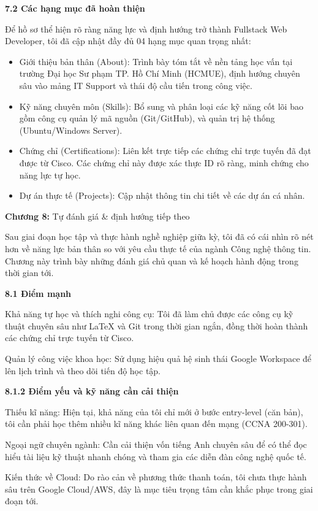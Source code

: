 \documentclass[
]{article}
\begin{document}
\textbf{7.2 Các hạng mục đã hoàn thiện}

Để hồ sơ thể hiện rõ ràng năng lực và định hướng trở thành Fullstack Web
Developer, tôi đã cập nhật đầy đủ 04 hạng mục quan trọng nhất:

\begin{itemize}
\item
  Giới thiệu bản thân (About): Trình bày tóm tắt về nền tảng học vấn tại
  trường Đại học Sư phạm TP. Hồ Chí Minh (HCMUE), định hướng chuyên sâu
  vào mảng IT Support và thái độ cầu tiến trong công việc.
\item
  Kỹ năng chuyên môn (Skills): Bổ sung và phân loại các kỹ năng cốt lõi
  bao gồm công cụ quản lý mã nguồn (Git/GitHub), và quản trị hệ thống
  (Ubuntu/Windows Server).
\item
  Chứng chỉ (Certifications): Liên kết trực tiếp các chứng chỉ trực
  tuyến đã đạt được từ Cisco. Các chứng chỉ này được xác thực ID rõ
  ràng, minh chứng cho năng lực tự học.
\item
  Dự án thực tế (Projects): Cập nhật thông tin chi tiết về các dự án cá
  nhân.
\end{itemize}

\textbf{Chương 8:} Tự đánh giá \& định hướng tiếp theo

Sau giai đoạn học tập và thực hành nghề nghiệp giữa kỳ, tôi đã có cái
nhìn rõ nét hơn về năng lực bản thân so với yêu cầu thực tế của ngành
Công nghệ thông tin. Chương này trình bày những đánh giá chủ quan và kế
hoạch hành động trong thời gian tới.

\textbf{8.1 Điểm mạnh}

Khả năng tự học và thích nghi công cụ: Tôi đã làm chủ được các công cụ
kỹ thuật chuyên sâu như LaTeX và Git trong thời gian ngắn, đồng thời
hoàn thành các chứng chỉ trực tuyến từ Cisco.

Quản lý công việc khoa học: Sử dụng hiệu quả hệ sinh thái Google
Workspace để lên lịch trình và theo dõi tiến độ học tập.

\textbf{8.1.2 Điểm yếu và kỹ năng cần cải thiện}

Thiếu kĩ năng: Hiện tại, khả năng của tôi chỉ mới ở bước entry-level
(căn bản), tôi cần phải học thêm nhiều kĩ năng khác liên quan đến mạng
(CCNA 200-301).

Ngoại ngữ chuyên ngành: Cần cải thiện vốn tiếng Anh chuyên sâu để có thể
đọc hiểu tài liệu kỹ thuật nhanh chóng và tham gia các diễn đàn công
nghệ quốc tế.

Kiến thức về Cloud: Do rào cản về phương thức thanh toán, tôi chưa thực
hành sâu trên Google Cloud/AWS, đây là mục tiêu trọng tâm cần khắc phục
trong giai đoạn tới.
\end{document}
